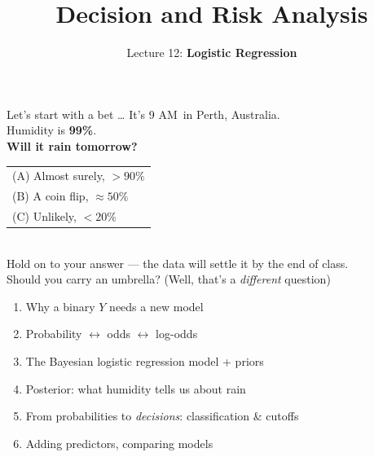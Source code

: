 \documentclass[aspectratio=43,11pt]{beamer}
\title{Decision and Risk Analysis}
\subtitle{Lecture 12: \textbf{Logistic Regression}}
\author{}
\date{\color{aggiemaroon}{DAEN 427 / ISEN 427 / ISEN 627 - Fall 2026\\
      \textbf{Alexander Abuabara}}}
\newcommand{\hl}[1]{\textcolor{warm}{\textbf{#1}}}
\begin{document}
\begin{frame}[plain]
  \titlepage
\end{frame}

\begin{frame}{Let's start with a bet \dots}
  \centering
  \Large It's 9 AM\ in Perth, Australia.\\[0.3em]
  Humidity is \hl{99\%}.\\[1em]
  \normalsize
  \textbf{Will it rain tomorrow?}\\[0.8em]
  \begin{tabular}{l}
    (A) Almost surely, $>90\%$\\[0.2em]
    (B) A coin flip, $\approx 50\%$\\[0.2em]
    (C) Unlikely, $<20\%$
  \end{tabular}\\[1.2em]
  \small Hold on to your answer --- the data will settle it by the end of class.\\[0.6em]
  \footnotesize\color{gray} Should you carry an umbrella? (Well, that's a \emph{different} question)
\end{frame}

\begin{frame}{}
  \begin{enumerate}
    \setlength\itemsep{0.6em}
    \item Why a binary $Y$ needs a new model
    \item Probability $\leftrightarrow$ odds $\leftrightarrow$ log-odds
    \item The Bayesian logistic regression model + priors
    \item Posterior: what humidity tells us about rain
    \item From probabilities to \emph{decisions}: classification \& cutoffs
    \item Adding predictors, comparing models
  \end{enumerate}
\end{frame}
\end{document}
